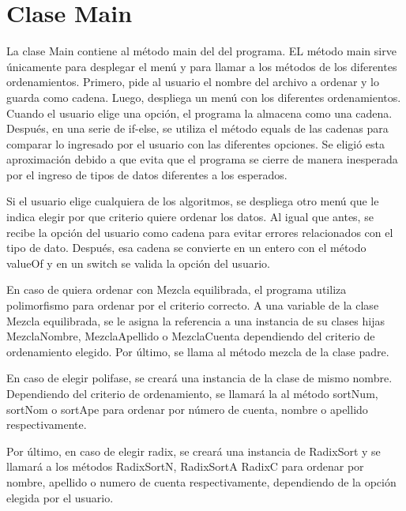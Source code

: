 \documentclass[11pt]{article}
\begin{document}
\section{Clase Main}
La clase Main contiene al método main del del programa. EL método main sirve únicamente para desplegar el menú y para llamar a los métodos de los diferentes ordenamientos. Primero, pide al usuario el nombre del archivo a ordenar y lo guarda como cadena. Luego, despliega un menú con los diferentes ordenamientos. Cuando el usuario elige una opción, el programa la almacena como una cadena. Después, en una serie de if-else, se utiliza el método equals de las cadenas para comparar lo ingresado por el usuario con las diferentes opciones. Se eligió esta aproximación debido a que evita que el programa se cierre de manera inesperada por el ingreso de tipos de datos diferentes a los esperados.
\par
Si el usuario elige cualquiera de los algoritmos, se despliega otro menú que le indica elegir por que criterio quiere ordenar los datos. Al igual que antes, se recibe la opción del usuario como cadena para evitar errores relacionados con el tipo de dato. Después, esa cadena se convierte en un entero con el método valueOf y en un switch se valida la opción del usuario. 
\par
En caso de quiera ordenar con Mezcla equilibrada, el programa utiliza polimorfismo para ordenar por el criterio correcto. A una variable de la clase Mezcla equilibrada, se le asigna la referencia a una instancia de su clases hijas MezclaNombre, MezclaApellido o MezclaCuenta dependiendo del criterio de ordenamiento elegido. Por último, se llama al método mezcla de la clase padre.
\par
En caso de elegir polifase, se creará una instancia de la clase de mismo nombre. Dependiendo del criterio de ordenamiento, se llamará la al método sortNum, sortNom o sortApe para ordenar por número de cuenta, nombre o apellido respectivamente.
\par
Por último, en caso de elegir radix, se creará una instancia de RadixSort y se llamará a los métodos RadixSortN, RadixSortA RadixC para ordenar por nombre, apellido o numero de cuenta respectivamente, dependiendo de la opción elegida por el usuario.
     
\end{document}
